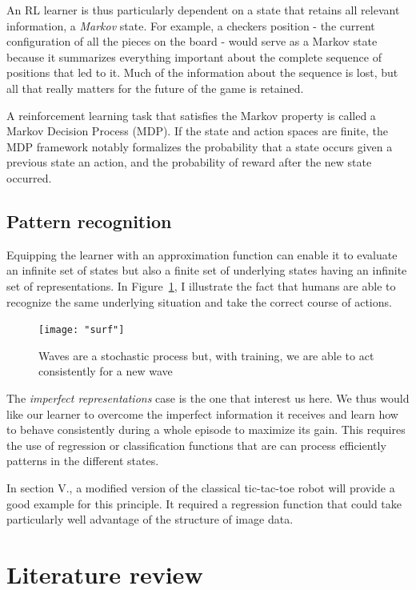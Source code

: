 \documentclass[scrartcl, 10.5 pt, conference]{ieeeconf}
\begin{document}
An RL learner is thus particularly dependent on a state that retains all relevant information, a \textit{Markov} state. For example, a checkers position - the current configuration of all the pieces on the board - would serve as a Markov state because it summarizes everything important about the complete sequence of positions that led to it. Much of the information about the sequence is lost, but all that really matters for the future of the game is retained. 

A reinforcement learning task that satisfies the Markov property is called a Markov Decision Process (MDP). If the state and action spaces are finite, the MDP framework notably formalizes the probability that a state occurs given a previous state an action, and the probability of reward after the new state occurred. 

\subsection{Pattern recognition}

Equipping the learner with an approximation function can enable it to evaluate an infinite set of states but also a finite set of underlying states having an infinite set of representations. In Figure~\ref{fig:surf}, I illustrate the fact that humans are able to recognize the same underlying situation and take the correct course of actions.

\begin{figure}
\begin{center}
\texttt{[image: "surf"]}
\caption{Waves are a stochastic process but, with training, we are able to act consistently for a new wave}
\label{fig:surf}
\end{center}
\end{figure}

The \textit{imperfect representations} case is the one that interest us here. We thus would like our learner to overcome the imperfect information it receives and learn how to behave consistently during a whole episode to maximize its gain. This requires the use of regression or classification functions that are can process efficiently patterns in the different states.

In section V., a modified version of the classical tic-tac-toe robot will provide a good example for this principle. It required a regression function that could take particularly well advantage of the structure of image data.

\section{Literature review}
\end{document}
